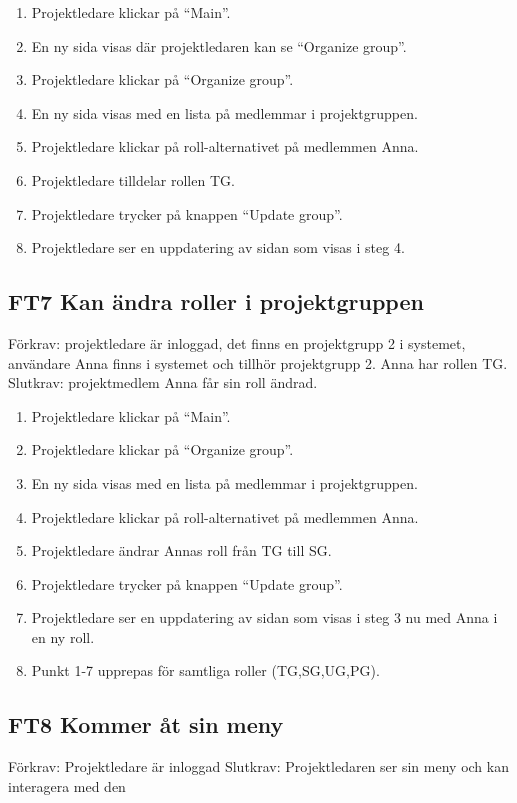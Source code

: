 \documentclass[paper=a4, fontsize=11pt,twoside]{article}
\begin{document}
	\begin{enumerate}
	 \item Projektledare klickar på “Main”.
	\item En ny sida visas där projektledaren kan se “Organize group”.
	\item Projektledare klickar på “Organize group”.
	\item En ny sida visas med en lista på medlemmar i projektgruppen.
	\item Projektledare klickar på roll-alternativet på medlemmen Anna.
	\item Projektledare tilldelar rollen TG.
	\item Projektledare trycker på knappen “Update group”.
	\item Projektledare ser en uppdatering av sidan som visas i steg 4. 
	  
	\end{enumerate}

	\subsection*{FT7 Kan ändra roller i projektgruppen }
	
	Förkrav: projektledare är inloggad, det finns en projektgrupp 2 i systemet,
	användare  Anna finns i systemet och tillhör projektgrupp 2. Anna har rollen TG.
	\newline
	Slutkrav: projektmedlem Anna får sin roll ändrad.
	
	\begin{enumerate}
	\item Projektledare klickar på “Main”.
	\item Projektledare klickar på “Organize group”.
	\item En ny sida visas med en lista på medlemmar i projektgruppen.
	\item Projektledare klickar på roll-alternativet på medlemmen Anna.
	\item Projektledare ändrar Annas roll från TG till SG.
	\item Projektledare trycker på knappen “Update group”.
	\item Projektledare ser en uppdatering av sidan som visas i steg 3 nu med Anna
	i en ny roll.
	\item Punkt 1-7 upprepas för samtliga roller (TG,SG,UG,PG).
	  
	\end{enumerate}
	
	\subsection*{FT8 Kommer åt sin meny}
	Förkrav: Projektledare är inloggad
	\newline
	Slutkrav: Projektledaren ser sin meny och kan interagera med den
	
\end{document}
